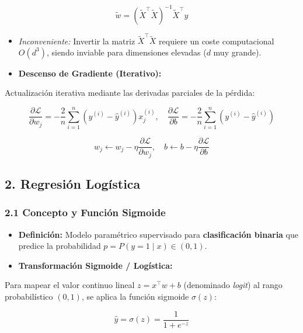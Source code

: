 \documentclass[11pt,oneside]{article}
\begin{document}
\[\tilde{w} = (\tilde{X}^\top \tilde{X})^{-1} \tilde{X}^\top y\]

\begin{itemize}

\item \emph{Inconveniente:} Invertir la matriz \(\tilde{X}^\top \tilde{X}\) requiere un coste computacional \(O(d^3)\), siendo inviable para dimensiones elevadas (\(d\) muy grande).

\item \textbf{Descenso de Gradiente (Iterativo):}

\end{itemize}

  Actualización iterativa mediante las derivadas parciales de la pérdida:

\[\frac{\partial \mathcal{L}}{\partial w_j} = -\frac{2}{n} \sum_{i=1}^{n} \left(y^{(i)} - \hat{y}^{(i)}\right) x_j^{(i)}, \quad \frac{\partial \mathcal{L}}{\partial b} = -\frac{2}{n} \sum_{i=1}^{n} \left(y^{(i)} - \hat{y}^{(i)}\right)\]

\[w_j \leftarrow w_j - \eta \frac{\partial \mathcal{L}}{\partial w_j}, \quad b \leftarrow b - \eta \frac{\partial \mathcal{L}}{\partial b}\]

\subsection{2. Regresión Logística}

\subsubsection{2.1 Concepto y Función Sigmoide}

\begin{itemize}

\item \textbf{Definición:} Modelo paramétrico supervisado para \textbf{clasificación binaria} que predice la probabilidad \(p = P(y=1 \mid x) \in (0, 1)\).

\item \textbf{Transformación Sigmoide / Logística:}

\end{itemize}

  Para mapear el valor continuo lineal \(z = x^\top w + b\) (denominado \emph{logit}) al rango probabilístico \((0, 1)\), se aplica la función sigmoide \(\sigma(z)\):

\[\hat{y} = \sigma(z) = \frac{1}{1 + e^{-z}}\]
\end{document}
